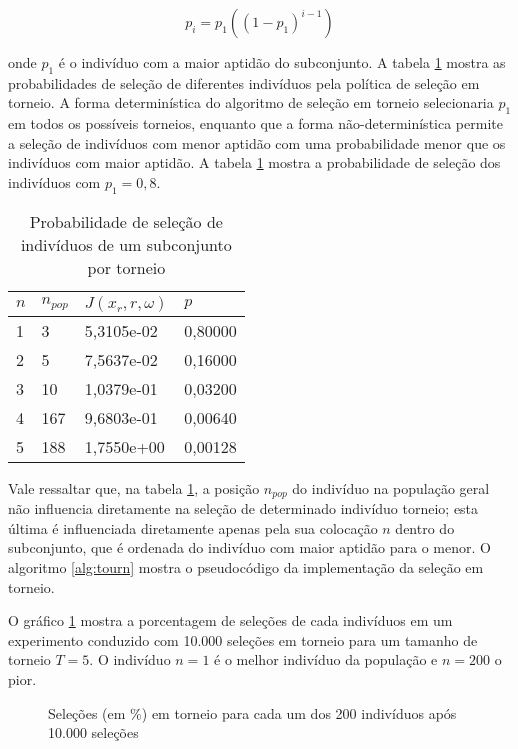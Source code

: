 \begin{equation}
\label{eq:torn}
p_i = p_1 ((1-p_1)^{i-1})
\end{equation}

\noindent onde $p_1$ é o indivíduo com a maior aptidão do subconjunto. A tabela \ref{tab:torn} mostra as probabilidades de seleção de diferentes indivíduos pela política de seleção em torneio. A forma determinística do algoritmo de seleção em torneio selecionaria $p_1$ em todos os possíveis torneios, enquanto que a forma não-determinística permite a seleção de indivíduos com menor aptidão com uma probabilidade menor que os indivíduos com maior aptidão. A tabela \ref{tab:torn} mostra a probabilidade de seleção dos indivíduos com $p_1 = 0,8$.

\begin{table}[!ht]
\centering
\begin{tabularx}{0.5\textwidth}{llll}
\hline $n$ & $n_{pop}$ & $J(x_r,r,\omega)$ & $p$ \\ \hline
1&3&5,3105e-02&0,80000\\
2&5&7,5637e-02&0,16000 \\
3&10&1,0379e-01&0,03200 \\
4&167&9,6803e-01&0,00640 \\
5&188&1,7550e+00&0,00128 \\ \hline
\end{tabularx}
\caption{Probabilidade de seleção de indivíduos de um subconjunto por torneio}
\label{tab:torn}
\end{table}

Vale ressaltar que, na tabela \ref{tab:torn}, a posição $n_{pop}$ do indivíduo na população geral não influencia diretamente na seleção de determinado indivíduo torneio; esta última é influenciada diretamente apenas pela sua colocação $n$ dentro do subconjunto, que é ordenada do indivíduo com maior aptidão para o menor. O algoritmo \ref{alg:tourn} mostra o pseudocódigo da implementação da seleção em torneio.

O gráfico \ref{fig:tourn} mostra a porcentagem de seleções de cada indivíduos em um experimento conduzido com 10.000 seleções em torneio para um tamanho de torneio $T=5$. O indivíduo $n=1$ é o melhor indivíduo da população e $n=200$ o pior.

\begin{figure}[!ht]
\centering
\pgfplotsset{compat=1.8}
\caption{Seleções (em $\%$) em torneio para cada um dos 200 indivíduos após 10.000 seleções}
\label{fig:tourn}
\end{figure}

